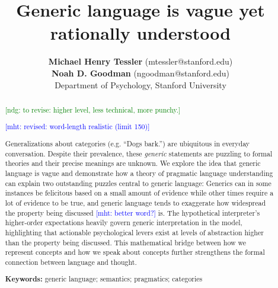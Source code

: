 \documentclass[10pt,letterpaper]{article}
\title{Generic language is vague yet rationally understood}
\author{{\large \bf Michael Henry Tessler} (mtessler@stanford.edu)\\ {\large \bf Noah D. Goodman} (ngoodman@stanford.edu) \\
  Department of Psychology, Stanford University}
\newcommand{\ndg}[1]{\textcolor{Green}{[ndg: #1]}}
\newcommand{\mht}[1]{\textcolor{Blue}{[mht: #1]}}
\begin{document}
\maketitle


\begin{abstract}
\ndg{to revise: higher level, less technical, more punchy.}

\mht{revised: word-length realistic (limit 150)}

Generalizations about categories (e.g. ``Dogs bark.'') are ubiquitous in everyday conversation. 
Despite their prevalence, these \emph{generic} statements are puzzling to formal theories and their precise meanings are unknown. 
We explore the idea that generic language is vague and demonstrate how a theory of pragmatic language understanding can 
explain two outstanding puzzles central to generic language: Generics can in some instances be felicitous based on a small amount of evidence while other times require a lot of evidence to be true, and generic language tends to exaggerate how widespread the property being discussed \mht{better word?}  is. 
The hypothetical interpreter's higher-order expectations heavily govern generic interpretation in the model, highlighting that actionable psychological levers exist at levels of abstraction higher than the property being discussed.
This mathematical bridge between how we represent concepts and how we speak about concepts further strengthens the formal connection between language and thought.


%
%


\textbf{Keywords:} 
generic language; semantics; pragmatics; categories
\end{abstract}
\end{document}
